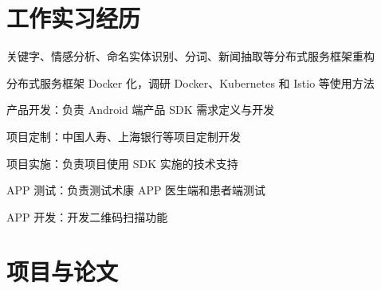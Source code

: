 \documentclass[]{deedy-resume-openfont}
\begin{document}
\hfill
\begin{minipage}[t]{0.68\textwidth}


\section{工作实习经历}

\sectionsep
{}
\vspace{\topsep}
\vspace{\topsep}
\begin{tightemize}
\item 关键字、情感分析、命名实体识别、分词、新闻抽取等分布式服务框架重构
\item 分布式服务框架 Docker 化，调研 Docker、Kubernetes 和 Istio 等使用方法
\end{tightemize}
\sectionsep

\sectionsep
{}
\vspace{\topsep}
\vspace{\topsep}
\begin{tightemize}
\item 产品开发：负责 Android 端产品 SDK 需求定义与开发
\item 项目定制：中国人寿、上海银行等项目定制开发
\item 项目实施：负责项目使用 SDK 实施的技术支持
\end{tightemize}
\sectionsep

\sectionsep
{}
\vspace{\topsep}
\begin{tightemize}
\item APP 测试：负责测试术康 APP 医生端和患者端测试
\item APP 开发：开发二维码扫描功能
\end{tightemize}
\sectionsep



\section{项目与论文}
\sectionsep


\end{minipage}
\end{document}
